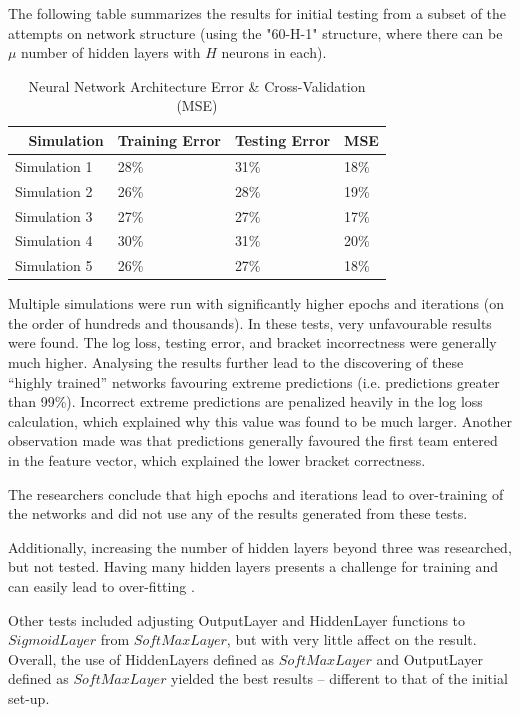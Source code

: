 \documentclass[conference]{IEEEtran}
\begin{document}
{The following table summarizes the results for initial testing from a subset of the attempts on network structure (using the "60-H-1" structure, where there can be $\mu$ number of hidden layers with $H$ neurons in each).

\begin{table}[H]
	\centering
    \begin{tabular}{|l|l|l|l|}
    \hline
    ~   \textbf{Simulation} & \textbf{Training Error} & \textbf{Testing Error} & \textbf{MSE}\\ \hline
    	Simulation 1 		& 28\% 						& 31\% 					& 18\% \\ \hline
	    Simulation 2 		& 26\% 						& 28\% 					& 19\% \\ \hline
	    Simulation 3 		& 27\% 						& 27\% 					& 17\% \\ \hline %
	    Simulation 4 		& 30\% 						& 31\% 					& 20\% \\ \hline
	    Simulation 5 		& 26\% 						& 27\% 					& 18\% \\ \hline %
    \end{tabular}
    \caption {Neural Network Architecture Error \& Cross-Validation (MSE)}
    \label{tab:nn-error}
\end{table}

Multiple simulations were run with significantly higher epochs and iterations (on the order of hundreds and thousands). 
In these tests, very unfavourable results were found. 
The log loss, testing error, and bracket incorrectness were generally much higher.
Analysing the results further lead to the discovering of these ``highly trained'' networks favouring extreme predictions (i.e. predictions greater than 99\%).
Incorrect extreme predictions are penalized heavily in the log loss calculation, which explained why this value was found to be much larger.
Another observation made was that predictions generally favoured the first team entered in the feature vector, which explained the lower bracket correctness.

The researchers conclude that high epochs and iterations lead to over-training of the networks and did not use any of the results generated from these tests.

Additionally, increasing the number of hidden layers beyond three was researched, but not tested.
Having many hidden layers presents a challenge for training and can easily lead to over-fitting \cite{bengio2007scaling}.

Other tests included adjusting OutputLayer and HiddenLayer functions to $SigmoidLayer$ from $SoftMaxLayer$, but with very little affect on the result.
Overall, the use of HiddenLayers defined as $SoftMaxLayer$ and OutputLayer defined as $SoftMaxLayer$ yielded the best results -- different to that of the initial set-up.

}
\end{document}
